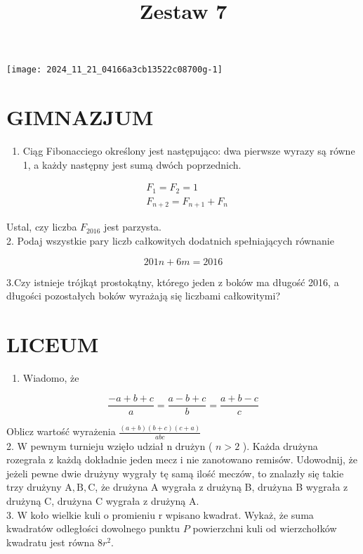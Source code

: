 \documentclass[10pt]{article}
\title{Zestaw 7 }
\author{}
\date{}
\begin{document}
\maketitle
\begin{center}
\texttt{[image: 2024\_11\_21\_04166a3cb13522c08700g-1]}
\end{center}

\section*{GIMNAZJUM}
\begin{enumerate}
  \item Ciąg Fibonacciego określony jest następująco: dwa pierwsze wyrazy są równe 1, a każdy następny jest sumą dwóch poprzednich.
\end{enumerate}

\[
\begin{aligned}
& F_{1}=F_{2}=1 \\
& F_{n+2}=F_{n+1}+F_{n}
\end{aligned}
\]

Ustal, czy liczba \(F_{2016}\) jest parzysta.\\
2. Podaj wszystkie pary liczb całkowitych dodatnich spełniających równanie

\[
201 n+6 m=2016
\]

3.Czy istnieje trójkąt prostokątny, którego jeden z boków ma długość 2016, a długości pozostałych boków wyrażają się liczbami całkowitymi?

\section*{LICEUM}
\begin{enumerate}
  \item Wiadomo, że
\end{enumerate}

\[
\frac{-a+b+c}{a}=\frac{a-b+c}{b}=\frac{a+b-c}{c}
\]

Oblicz wartość wyrażenia \(\frac{(a+b)(b+c)(c+a)}{a b c}\)\\
2. W pewnym turnieju wzięło udział n drużyn ( \(n>2\) ). Każda drużyna rozegrała z każdą dokładnie jeden mecz i nie zanotowano remisów. Udowodnij, że jeżeli pewne dwie drużyny wygrały tę samą ilość meczów, to znalazły się takie trzy drużyny \(\mathrm{A}, \mathrm{B}, \mathrm{C}\), że drużyna A wygrała z drużyną B, drużyna B wygrała z drużyną C, drużyna C wygrała z drużyną A.\\
3. W koło wielkie kuli o promieniu r wpisano kwadrat. Wykaż, że suma kwadratów odległości dowolnego punktu \(P\) powierzchni kuli od wierzchołków kwadratu jest równa \(8 r^{2}\).
\end{document}
